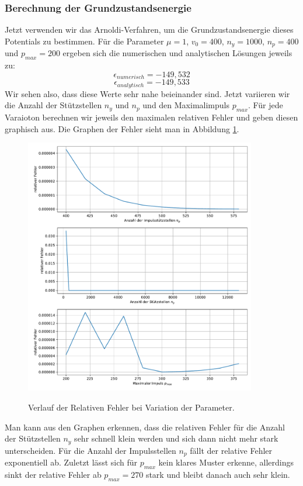 \documentclass[11pt,a4paper]{article}
\begin{document}
\subsubsection*{Berechnung der Grundzustandsenergie}
Jetzt verwenden wir das Arnoldi-Verfahren, um die Grundzustandsenergie dieses Potentials zu bestimmen.
Für die Parameter $\mu=1$, $v_0=400$, $n_y = 1000$, $n_p = 400$ und $p_{max} = 200$ ergeben sich die numerischen und analytischen Lösungen jeweils zu:
\begin{equation}
	\epsilon_{numerisch} = -149,532
\end{equation}
\begin{equation}
	\epsilon_{analytisch} = -149,533
\end{equation}
Wir sehen also, dass diese Werte sehr nahe beieinander sind. Jetzt variieren wir die Anzahl der Stützstellen $n_y$ und $n_p$ und den Maximalimpuls $p_{max}$. Für jede Varaioton berechnen wir jeweils den maximalen relativen Fehler und geben diesen graphisch aus. Die Graphen der Fehler sieht man in Abbildung \ref{fig:rel_errors}.
\begin{figure}[htbp]
	\includegraphics[width=0.9\textwidth]{rel_error_params.pdf}\label{fig:rel_errors}
	\caption{Verlauf der Relativen Fehler bei Variation der Parameter.}
\end{figure}
Man kann aus den Graphen erkennen, dass die relativen Fehler für die Anzahl der Stützstellen $n_y$ sehr schnell klein werden und sich dann nicht mehr stark unterscheiden. Für die Anzahl der Impulsstellen $n_p$ fällt der relative Fehler exponentiell ab. Zuletzt lässt sich für $p_{max}$ kein klares Muster erkenne, allerdings sinkt der relative Fehler ab $p_{max} = 270$ stark und bleibt danach auch sehr klein.
\end{document}
